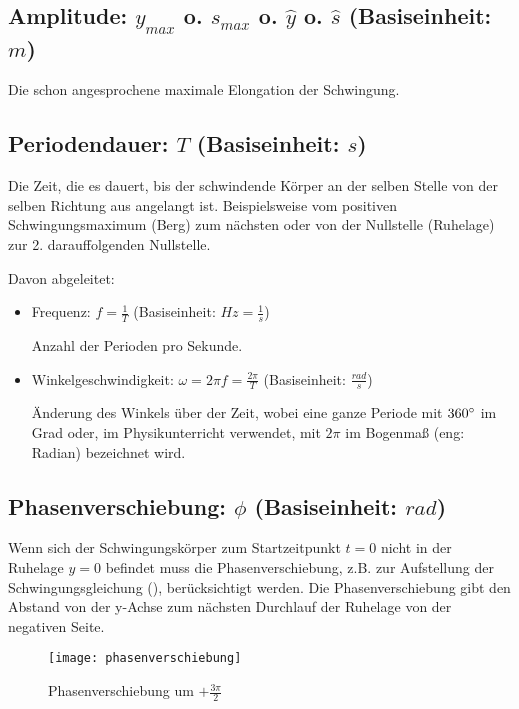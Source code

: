\subsection[Amplitude]{Amplitude: $y_{max}$ o. $s_{max}$ o. $\hat{y}$ o. $\hat{s}$ (Basiseinheit: $m$)}

Die schon angesprochene maximale Elongation der Schwingung.


\subsection[Periodendauer]{Periodendauer: $T$ (Basiseinheit: $s$)}
	
Die Zeit, die es dauert, bis der schwindende Körper an der selben Stelle von der selben Richtung aus angelangt ist. Beispielsweise vom positiven Schwingungsmaximum (\glqq Berg\grqq) zum nächsten oder von der Nullstelle (\glqq Ruhelage\grqq) zur 2. darauffolgenden Nullstelle.

Davon abgeleitet:
\begin{itemize}
	\item Frequenz: $f=\frac{1}{T}$ (Basiseinheit: $Hz=\frac{1}{s}$)
	
	Anzahl der Perioden pro Sekunde.
	\item Winkelgeschwindigkeit: $\omega=2 \pi f=\frac{2 \pi}{T}$ (Basiseinheit: $\frac{rad}{s}$)
		
	Änderung des Winkels über der Zeit, wobei eine ganze Periode mit $360 \degree$ im Grad oder, im Physikunterricht verwendet, mit $2 \pi$ im Bogenmaß (eng: \glqq Radian\grqq) bezeichnet wird.
\end{itemize}


\subsection[Phasenverschiebung]{Phasenverschiebung: $\phi$ (Basiseinheit: $rad$)}
	
Wenn sich der Schwingungskörper zum Startzeitpunkt $t=0$ nicht in der Ruhelage $y=0$ befindet muss die Phasenverschiebung, z.B. zur Aufstellung der Schwingungsgleichung (), berücksichtigt werden. Die Phasenverschiebung gibt den Abstand von der y-Achse zum nächsten Durchlauf der Ruhelage von der negativen Seite.

	\begin{figure}[!h] \label{phasenverschiebung}
	
		\centering
		\texttt{[image: phasenverschiebung]}
		\caption{Phasenverschiebung um $+\frac{3\pi}{2}$}
	
	\end{figure}

